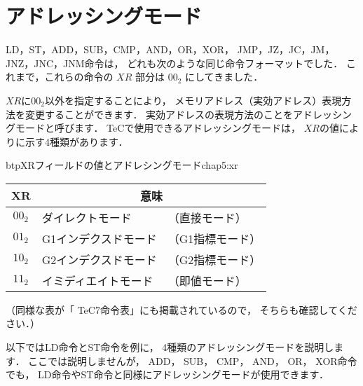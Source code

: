 \begin{center}
\end{center}

\newpage
\section{アドレッシングモード}
LD，ST，ADD，SUB，CMP，AND，OR，XOR，
JMP，JZ，JC，JM，JNZ，JNC，JNM命令は，
どれも次のような同じ命令フォーマットでした．
これまで，これらの命令の $XR$ 部分は $00_2$ にしてきました．

\twoByte{\OP}{\GR~\XR}{\A}

$XR$に$00_2$以外を指定することにより，
メモリアドレス（実効アドレス）表現方法を変更することができます．
実効アドレスの表現方法のことをアドレッシングモードと呼びます．
TeCで使用できるアドレッシングモードは，
$XR$の値によりに示す4種類があります．

\begin{mytable}{btp}{XRフィールドの値とアドレシングモード}{chap5:xr}
{\small\begin{center}
\begin{tabular}{c|l l}
\hline
\hline
XR & \multicolumn{2}{|c}{意味} \\
\hline
$00_2$ & ダイレクトモード     & （直接モード）   \\
$01_2$ & G1インデクスドモード & （G1指標モード） \\
$10_2$ & G2インデクスドモード & （G2指標モード） \\
$11_2$ & イミディエイトモード & （即値モード）   \\
\end{tabular}
\end{center}}
\end{mytable}

（同様な表が「 TeC7命令表」にも掲載されているので，
そちらも確認してください．）

以下ではLD命令とST命令を例に，
4種類のアドレッシングモードを説明します．
ここでは説明しませんが，
ADD， SUB， CMP， AND， OR， XOR命令でも，
LD命令やST命令と同様にアドレッシングモードが使用できます．

